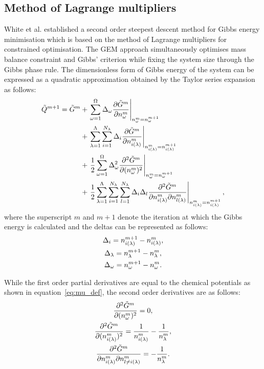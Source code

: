 \subsection{Method of Lagrange multipliers}
White et al. \cite{White:58} established a second order steepest descent method for Gibbs energy minimisation which is based on the method of Lagrange multipliers for constrained optimisation. The GEM approach simultaneously optimises mass balance constraint and Gibbs' criterion while fixing the system size through the Gibbs phase rule. The dimensionless form of Gibbs energy of the system can be expressed as a quadratic approximation obtained by the Taylor series expansion as follows:
  \begin{equation}\label{eq:GibbsTaylor}
    \begin{split}
      \tilde{Q}^{m+1} = \tilde{G}^{m} &+ \left .\sumstoichphase \Delta_{\omega} \pder{\tilde{G}^m}{\molestoich^m} \right \vert_{\molestoich^m = \molestoich^{m+1}} \\
                      &+ \left . \sumsolnphase \sumspecies \Delta_i \pder{\tilde{G}^m}{\molespecies{i}^m}\right \vert_{\molespecies{i}^m = \molespecies{i}^{m+1}} \\
                      &+ \left . \frac{1}{2} \sumstoichphase \Delta^2_{\omega} \ppder{\tilde{G}^m}{\molestoich^m} \right \vert_{\molestoich^m = \molestoich^{m+1}} \\
                      &+ \left . \frac{1}{2} \sumsolnphase \sumspecies \sumspecies[l] \Delta_i \Delta_l \pqder{\tilde{G}^m}{\molespecies{i}^m}{\molespecies{l}^m} \right \vert_{\molespecies{i}^m = \molespecies{i}^{m+1}},
    \end{split}
  \end{equation}
where the superscript $m$ and $m+1$ denote the iteration at which the Gibbs energy is calculated and the deltas can be represented as follows:
  \begin{gather}
      \Delta_i = \molespecies{i}^{m+1} - \molespecies{i}^{m},\\
      \Delta_\lambda = \molesol^{m+1} - \molesol^{m}, \\
      \Delta_\omega = \molestoich^{m+1} - \molestoich^{m}.
  \end{gather}

While the first order partial derivatives are equal to the chemical potentials as shown in equation~\eqref{eq:mu_def}, the second order derivatives are as follows:
\begin{gather}
  \ppder{\tilde{G}^m}{\molestoich^m} = 0, \label{eq:partial1}\\
  \ppder{\tilde{G}^m}{\molespecies{i}^m} = \frac{1}{\molespecies{i}^m} - \frac{1}{\molesol^m}, \label{eq:partial2} \\
  \pqder{\tilde{G}^m}{\molespecies{i}^m}{\molespecies{l \neq i}^m} = - \frac{1}{\molesol^m}. \label{eq:partial3}
\end{gather}

